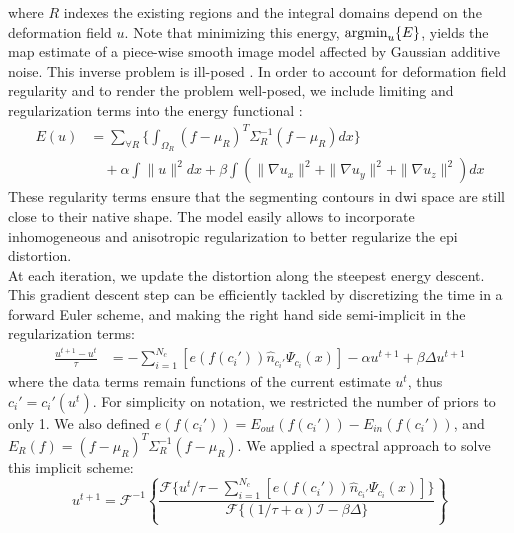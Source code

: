 where $R$ indexes the existing regions and the integral domains
depend on the deformation field $u$. Note
that minimizing this energy, $\operatorname{argmin}_u\{E\}$, yields the \gls{map} 
estimate of a piece-wise smooth image model affected by Gaussian 
additive noise. This inverse problem is ill-posed
\cite{bertero_ill-posed_1988,hadamard_sur_1902}.
In order to account for deformation field regularity and to render the 
problem well-posed, we include limiting and regularization terms into 
the energy functional \cite{morozov_linear_1975,tichonov_solution_1963}:
%
\begin{align}
\label{eq:complete_energy}
E(u) &= \sum_{\forall{R}} \lbrace \int_{\Omega_R} (f-\mu_R)^T\Sigma_R^{-1}(f-\mu_R) dx \rbrace \nonumber \\
&\quad + \alpha \int  \|u\|^2 dx + \beta \int \left( \|\nabla u_x\|^2 + \|\nabla u_y\|^2 + \|\nabla u_z\|^2\right) dx
\end{align}
%
These regularity terms ensure that the segmenting contours in 
\gls{dwi} space are still close to their native shape. The model
easily allows to incorporate inhomogeneous and anisotropic 
regularization \cite{nagel_investigation_1986} to better regularize
the \gls{epi} distortion. \\
%

At each iteration, we update the distortion along the steepest 
energy descent. This gradient descent step can be efficiently 
tackled by discretizing the time in a forward Euler scheme, 
and making the right hand side semi-implicit in the 
regularization terms:
%
\begin{align}
\frac{u^{t+1}-u^t}{\tau} &= - \sum_{i=1}^{N_c} \left[ e(f(c_i'))  \hat{n}_{c_i'} \Psi_{c_i}(x) \right] -\alpha u^{t+1} + \beta\Delta u^{t+1}
\end{align}
%
where the data terms remain functions of the current estimate 
$u^t$, thus $c_i' = c_i'(u^t)$. For simplicity on notation, we 
restricted the number of priors to only 1. We also defined 
$e(f(c_i')) = E_{out}(f(c_i')) - E_{in}(f(c_i'))$, 
and $E_R(f) = {(f-\mu_R)^T\Sigma_R^{-1}(f-\mu_R)}$.
We applied a spectral approach to solve this implicit scheme:
%
\begin{equation}
u^{t+1} = \mathcal{F}^{-1}\left\{ \frac{\mathcal{F}\{u^t/\tau
- \sum_{i=1}^{N_c} \left[e(f(c_i')) \hat{n}_{c_i'} \Psi_{c_i}(x) \right]  \}}{\mathcal{F}\{(1/\tau+\alpha)\mathcal{I}-\beta\Delta\}} \right\}
\end{equation}
%
